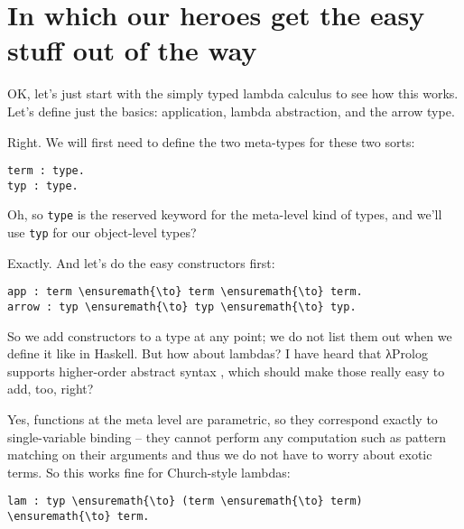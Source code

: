 \section{In which our heroes get the easy stuff out of the
way}\label{in-which-our-heroes-get-the-easy-stuff-out-of-the-way}

\heroSTUDENT{} OK, let's just start with the simply typed lambda calculus to
see how this works. Let's define just the basics: application, lambda
abstraction, and the arrow type.

\heroADVISOR{} Right. We will first need to define the two meta-types for
these two sorts:

\importantCodeblock{}

\begin{verbatim}
term : type.
typ : type.
\end{verbatim}

\importantCodeblockEnd{}

\heroSTUDENT{} Oh, so \texttt{type} is the reserved keyword for the meta-level
kind of types, and we'll use \texttt{typ} for our object-level types?

\heroADVISOR{} Exactly. And let's do the easy constructors first:

\importantCodeblock{}

\begin{verbatim}
app : term \ensuremath{\to} term \ensuremath{\to} term.
arrow : typ \ensuremath{\to} typ \ensuremath{\to} typ.
\end{verbatim}

\importantCodeblockEnd{}

\heroSTUDENT{} So we add constructors to a type at any point; we do not list
them out when we define it like in Haskell. But how about lambdas? I
have heard that \foreignlanguage{greek}{λ}Prolog supports higher-order abstract syntax
\citep{hoas-standard-reference}, which should make those really easy to
add, too, right?

\heroADVISOR{} Yes, functions at the meta level are parametric, so they
correspond exactly to single-variable binding -- they cannot perform any
computation such as pattern matching on their arguments and thus we do
not have to worry about exotic terms. So this works fine for
Church-style lambdas:

\importantCodeblock{}

\begin{verbatim}
lam : typ \ensuremath{\to} (term \ensuremath{\to} term) \ensuremath{\to} term.
\end{verbatim}

